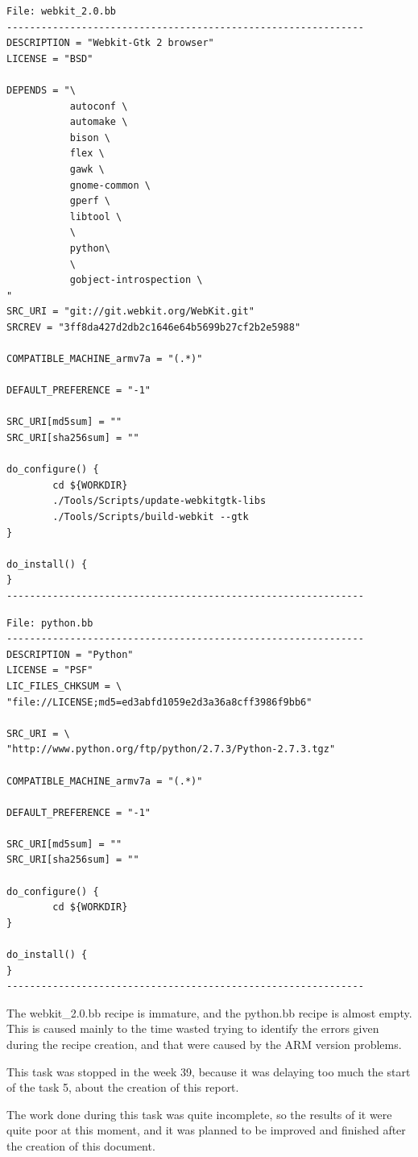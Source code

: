 \documentclass[a4paper,11pt,openany]{report}
\begin{document}
\begin{verbatim}
File: webkit_2.0.bb
--------------------------------------------------------------
DESCRIPTION = "Webkit-Gtk 2 browser"
LICENSE = "BSD"

DEPENDS = "\
           autoconf \
           automake \
           bison \
           flex \
           gawk \
           gnome-common \
           gperf \
           libtool \
           \
           python\
           \
           gobject-introspection \
"
SRC_URI = "git://git.webkit.org/WebKit.git"
SRCREV = "3ff8da427d2db2c1646e64b5699b27cf2b2e5988"

COMPATIBLE_MACHINE_armv7a = "(.*)"

DEFAULT_PREFERENCE = "-1"

SRC_URI[md5sum] = ""
SRC_URI[sha256sum] = ""

do_configure() {
        cd ${WORKDIR}
        ./Tools/Scripts/update-webkitgtk-libs
        ./Tools/Scripts/build-webkit --gtk
}

do_install() {
}
--------------------------------------------------------------
\end{verbatim}

\begin{verbatim}
File: python.bb
--------------------------------------------------------------
DESCRIPTION = "Python"
LICENSE = "PSF"
LIC_FILES_CHKSUM = \
"file://LICENSE;md5=ed3abfd1059e2d3a36a8cff3986f9bb6"

SRC_URI = \
"http://www.python.org/ftp/python/2.7.3/Python-2.7.3.tgz"

COMPATIBLE_MACHINE_armv7a = "(.*)"

DEFAULT_PREFERENCE = "-1"

SRC_URI[md5sum] = ""
SRC_URI[sha256sum] = ""

do_configure() {
        cd ${WORKDIR}
}

do_install() {
}
--------------------------------------------------------------
\end{verbatim}

The webkit\_2.0.bb recipe is immature, and the python.bb recipe is almost empty. This is caused mainly to the time wasted trying to identify the errors given during the recipe creation, and that were caused by the ARM version problems.

This task was stopped in the week 39, because it was delaying too much the start of the task 5, about the creation of this report.

The work done during this task was quite incomplete, so the results of it were quite poor at this moment, and it was planned to be improved and finished after the creation of this document.
\end{document}
